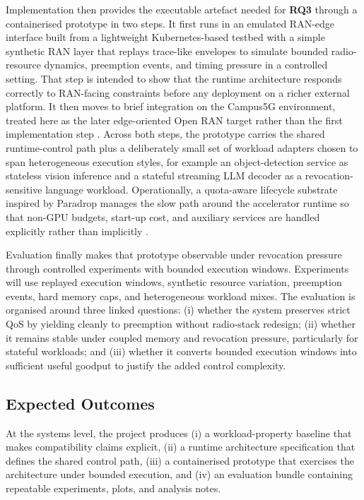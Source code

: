 \documentclass[a4paper,11pt]{article}
\begin{document}
Implementation then provides the executable artefact needed for \textbf{RQ3} through a containerised prototype in two steps. It first runs in an emulated RAN-edge interface built from a lightweight Kubernetes-based testbed with a simple synthetic RAN layer that replays trace-like envelopes to simulate bounded radio-resource dynamics, preemption events, and timing pressure in a controlled setting. That step is intended to show that the runtime architecture responds correctly to RAN-facing constraints before any deployment on a richer external platform. It then moves to brief integration on the Campus5G environment, treated here as the later edge-oriented Open RAN target rather than the first implementation step \cite{campus5g}. Across both steps, the prototype carries the shared runtime-control path plus a deliberately small set of workload adapters chosen to span heterogeneous execution styles, for example an object-detection service as stateless vision inference and a stateful streaming LLM decoder as a revocation-sensitive language workload. Operationally, a quota-aware lifecycle substrate inspired by Paradrop manages the slow path around the accelerator runtime so that non-GPU budgets, start-up cost, and auxiliary services are handled explicitly rather than implicitly \cite{paradrop}.

Evaluation finally makes that prototype observable under revocation pressure through controlled experiments with bounded execution windows. Experiments will use replayed execution windows, synthetic resource variation, preemption events, hard memory caps, and heterogeneous workload mixes. The evaluation is organised around three linked questions: (i) whether the system preserves strict QoS by yielding cleanly to preemption without radio-stack redesign; (ii) whether it remains stable under coupled memory and revocation pressure, particularly for stateful workloads; and (iii) whether it converts bounded execution windows into sufficient useful goodput to justify the added control complexity.

\subsection{Expected Outcomes}

At the systems level, the project produces (i) a workload-property baseline that makes compatibility claims explicit, (ii) a runtime architecture specification that defines the shared control path, (iii) a containerised prototype that exercises the architecture under bounded execution, and (iv) an evaluation bundle containing repeatable experiments, plots, and analysis notes.
\end{document}
